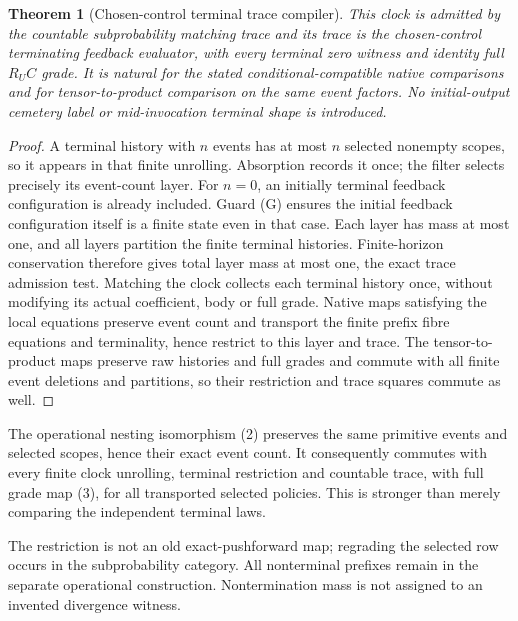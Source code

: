 \documentclass[11pt]{article}
\newtheorem{theorem}{Theorem}\newtheorem{proposition}[theorem]{Proposition}
\begin{document}
\begin{theorem}[Chosen-control terminal trace compiler]
This clock is admitted by the countable subprobability matching trace and its trace is the chosen-control terminating feedback evaluator, with every terminal zero witness and identity full $R_UC$ grade. It is natural for the stated conditional-compatible native comparisons and for tensor-to-product comparison on the same event factors. No initial-output cemetery label or mid-invocation terminal shape is introduced.
\end{theorem}
\begin{proof}
A terminal history with $n$ events has at most $n$ selected nonempty scopes, so it appears in that finite unrolling. Absorption records it once; the filter selects precisely its event-count layer. For $n=0$, an initially terminal feedback configuration is already included. Guard (G) ensures the initial feedback configuration itself is a finite state even in that case. Each layer has mass at most one, and all layers partition the finite terminal histories. Finite-horizon conservation therefore gives total layer mass at most one, the exact trace admission test. Matching the clock collects each terminal history once, without modifying its actual coefficient, body or full grade. Native maps satisfying the local equations preserve event count and transport the finite prefix fibre equations and terminality, hence restrict to this layer and trace. The tensor-to-product maps preserve raw histories and full grades and commute with all finite event deletions and partitions, so their restriction and trace squares commute as well.
\end{proof}

The operational nesting isomorphism (2) preserves the same primitive events and selected scopes, hence their exact event count. It consequently commutes with every finite clock unrolling, terminal restriction and countable trace, with full grade map (3), for all transported selected policies. This is stronger than merely comparing the independent terminal laws.

The restriction is not an old exact-pushforward map; regrading the selected row occurs in the subprobability category. All nonterminal prefixes remain in the separate operational construction. Nontermination mass is not assigned to an invented divergence witness.
\end{document}
